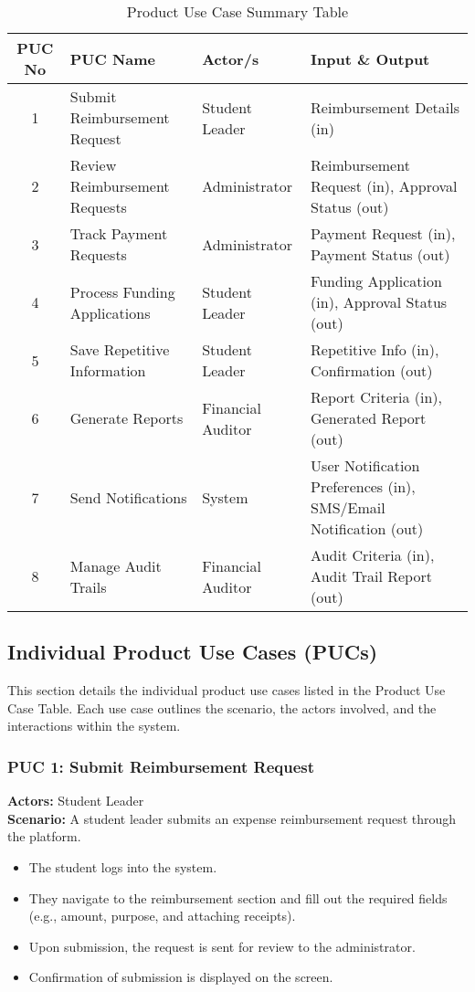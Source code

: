 \documentclass[12pt]{article}
\begin{document}
\begin{table}[h]
    \centering
    \caption{Product Use Case Summary Table}
    \begin{tabular}{|c|l|l|l|}
        \hline
        \textbf{PUC No} & \textbf{PUC Name} & \textbf{Actor/s} & \textbf{Input \& Output} \\ \hline
        1 & Submit Reimbursement Request & Student Leader & Reimbursement Details (in) \\ \hline
        2 & Review Reimbursement Requests & Administrator & Reimbursement Request (in), Approval Status (out) \\ \hline
        3 & Track Payment Requests & Administrator & Payment Request (in), Payment Status (out) \\ \hline
        4 & Process Funding Applications & Student Leader & Funding Application (in), Approval Status (out) \\ \hline
        5 & Save Repetitive Information & Student Leader & Repetitive Info (in), Confirmation (out) \\ \hline
        6 & Generate Reports & Financial Auditor & Report Criteria (in), Generated Report (out) \\ \hline
        7 & Send Notifications & System & User Notification Preferences (in), SMS/Email Notification (out) \\ \hline
        8 & Manage Audit Trails & Financial Auditor & Audit Criteria (in), Audit Trail Report (out) \\ \hline
    \end{tabular}
\end{table}

\subsection{Individual Product Use Cases (PUCs)}
This section details the individual product use cases listed in the Product Use Case Table. Each use case outlines the scenario, the actors involved, and the interactions within the system.

\subsubsection{PUC 1: Submit Reimbursement Request}
\textbf{Actors:} Student Leader \\
\textbf{Scenario:} A student leader submits an expense reimbursement request through the platform.
\begin{itemize}
    \item The student logs into the system.
    \item They navigate to the reimbursement section and fill out the required fields (e.g., amount, purpose, and attaching receipts).
    \item Upon submission, the request is sent for review to the administrator.
    \item Confirmation of submission is displayed on the screen.
\end{itemize}
\end{document}
